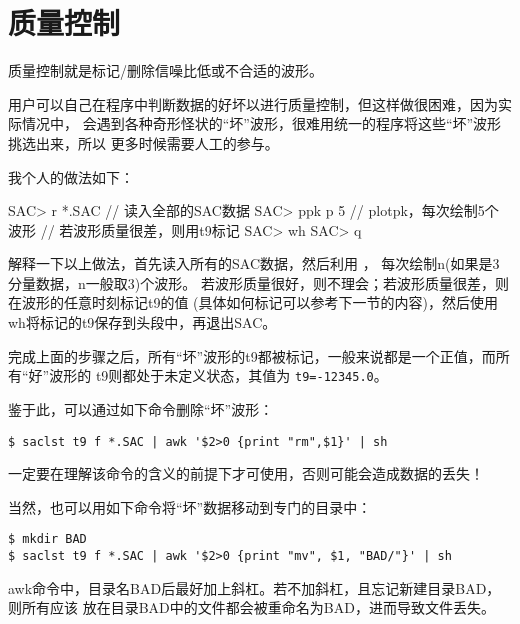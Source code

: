 \section{质量控制}

质量控制就是标记/删除信噪比低或不合适的波形。

用户可以自己在程序中判断数据的好坏以进行质量控制，但这样做很困难，因为实际情况中，
会遇到各种奇形怪状的``坏''波形，很难用统一的程序将这些``坏''波形挑选出来，所以
更多时候需要人工的参与。


我个人的做法如下：
\begin{SACCode}
SAC> r *.SAC        // 读入全部的SAC数据
SAC> ppk p 5        // plotpk，每次绘制5个波形
// 若波形质量很差，则用t9标记
SAC> wh
SAC> q
\end{SACCode}

解释一下以上做法，首先读入所有的SAC数据，然后利用 ，
每次绘制n(如果是3分量数据，n一般取3)个波形。
若波形质量很好，则不理会；若波形质量很差，则在波形的任意时刻标记t9的值
(具体如何标记可以参考下一节的内容)，然后使用wh将标记的t9保存到头段中，再退出SAC。

完成上面的步骤之后，所有``坏''波形的t9都被标记，一般来说都是一个正值，而所有``好''波形的
t9则都处于未定义状态，其值为 \texttt{t9=-12345.0}。

鉴于此，可以通过如下命令删除``坏''波形：
\begin{verbatim}
$ saclst t9 f *.SAC | awk '$2>0 {print "rm",$1}' | sh
\end{verbatim}
\begin{note}
一定要在理解该命令的含义的前提下才可使用，否则可能会造成数据的丢失！
\end{note}

当然，也可以用如下命令将``坏''数据移动到专门的目录中：
\begin{verbatim}
$ mkdir BAD
$ saclst t9 f *.SAC | awk '$2>0 {print "mv", $1, "BAD/"}' | sh
\end{verbatim}
\begin{note}
awk命令中，目录名BAD后最好加上斜杠。若不加斜杠，且忘记新建目录BAD，则所有应该
放在目录BAD中的文件都会被重命名为BAD，进而导致文件丢失。
\end{note}
